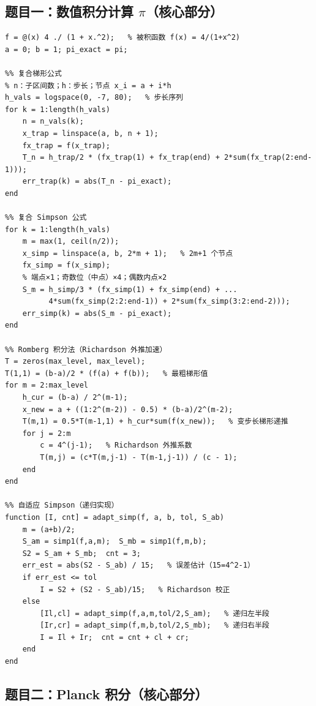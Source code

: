 \documentclass[UTF8,a4paper,11pt]{article}
\begin{document}
\subsection{题目一：数值积分计算 $\pi$（核心部分）}

\begin{lstlisting}[style=matlab, caption={problem1\_pi\_integration.m（核心算法）}]
f = @(x) 4 ./ (1 + x.^2);   % 被积函数 f(x) = 4/(1+x^2)
a = 0; b = 1; pi_exact = pi;

%% 复合梯形公式
% n：子区间数；h：步长；节点 x_i = a + i*h
h_vals = logspace(0, -7, 80);   % 步长序列
for k = 1:length(h_vals)
    n = n_vals(k);
    x_trap = linspace(a, b, n + 1);
    fx_trap = f(x_trap);
    T_n = h_trap/2 * (fx_trap(1) + fx_trap(end) + 2*sum(fx_trap(2:end-1)));
    err_trap(k) = abs(T_n - pi_exact);
end

%% 复合 Simpson 公式
for k = 1:length(h_vals)
    m = max(1, ceil(n/2));
    x_simp = linspace(a, b, 2*m + 1);   % 2m+1 个节点
    fx_simp = f(x_simp);
    % 端点×1；奇数位（中点）×4；偶数内点×2
    S_m = h_simp/3 * (fx_simp(1) + fx_simp(end) + ...
          4*sum(fx_simp(2:2:end-1)) + 2*sum(fx_simp(3:2:end-2)));
    err_simp(k) = abs(S_m - pi_exact);
end

%% Romberg 积分法（Richardson 外推加速）
T = zeros(max_level, max_level);
T(1,1) = (b-a)/2 * (f(a) + f(b));   % 最粗梯形值
for m = 2:max_level
    h_cur = (b-a) / 2^(m-1);
    x_new = a + ((1:2^(m-2)) - 0.5) * (b-a)/2^(m-2);
    T(m,1) = 0.5*T(m-1,1) + h_cur*sum(f(x_new));   % 变步长梯形递推
    for j = 2:m
        c = 4^(j-1);   % Richardson 外推系数
        T(m,j) = (c*T(m,j-1) - T(m-1,j-1)) / (c - 1);
    end
end

%% 自适应 Simpson（递归实现）
function [I, cnt] = adapt_simp(f, a, b, tol, S_ab)
    m = (a+b)/2;
    S_am = simp1(f,a,m);  S_mb = simp1(f,m,b);
    S2 = S_am + S_mb;  cnt = 3;
    err_est = abs(S2 - S_ab) / 15;   % 误差估计（15=4^2-1）
    if err_est <= tol
        I = S2 + (S2 - S_ab)/15;   % Richardson 校正
    else
        [Il,cl] = adapt_simp(f,a,m,tol/2,S_am);   % 递归左半段
        [Ir,cr] = adapt_simp(f,m,b,tol/2,S_mb);   % 递归右半段
        I = Il + Ir;  cnt = cnt + cl + cr;
    end
end
\end{lstlisting}

\subsection{题目二：Planck 积分（核心部分）}
\end{document}
